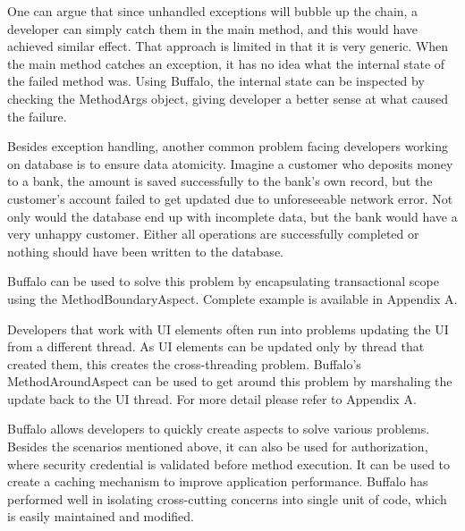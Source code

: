 One can argue that since unhandled exceptions will bubble up the chain, a developer can simply catch them in the main method, and this would have achieved similar effect. That approach is limited in that it is very generic. When the main method catches an exception, it has no idea what the internal state of the failed method was. Using Buffalo, the internal state can be inspected by checking the MethodArgs object, giving developer a better sense at what caused the failure.

Besides exception handling, another common problem facing developers working on database is to ensure data atomicity. Imagine a customer who deposits money to a bank, the amount is saved successfully to the bank’s own record, but the customer’s account failed to get updated due to unforeseeable network error. Not only would the database end up with incomplete data, but the bank would have a very unhappy customer. Either all operations are successfully completed or nothing should have been written to the database.

Buffalo can be used to solve this problem by encapsulating transactional scope using the MethodBoundaryAspect. Complete example is available in Appendix A.

Developers that work with UI elements often run into problems updating the UI from a different thread. As UI elements can be updated only by thread that created them, this creates the cross-threading problem. Buffalo’s MethodAroundAspect can be used to get around this problem by marshaling the update back to the UI thread. For more detail please refer to Appendix A.

Buffalo allows developers to quickly create aspects to solve various problems. Besides the scenarios mentioned above, it can also be used for authorization, where security credential is validated before method execution. It can be used to create a caching mechanism to improve application performance. Buffalo has performed well in isolating cross-cutting concerns into single unit of code, which is easily maintained and modified.
